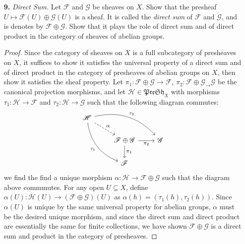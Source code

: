 \documentclass{article}
\newcommand{\fF}{\mathscr{F}}
\newcommand{\fG}{\mathscr{G}}
\begin{document}
\begin{enumerate} [label=\textbf{\arabic*.}, leftmargin=0em]
\item[\textbf{9.}] \textit{Direct Sum.} Let $\fF$ and $\fG$ be sheaves on $X$. Show that the presheaf $U \mapsto \fF(U) \oplus \fG(U)$ is a sheaf. It is called the \textit{direct sum} of $\fF$ and $\fG$, and is denotes by $\fF \oplus \fG$. Show that it plays the role of direct sum and of direct product in the category of sheaves of abelian groups.

\begin{proof}
   Since the category of sheaves on $X$ is a full subcategory of presheaves on $X$, it suffices to show it satisfies the universal property of a direct sum and of direct product in the category of presheaves of abelian groups on $X$, then show it satisfies the sheaf property. Let $\pi_1 : \fF \oplus \fG \to \fF$, $\pi_2 : \fF \oplus \fG_ \to \fG$ be the canonical projection morphisms, and let $\mathscr{H} \in \mathfrak{PreSh}_X$ with morphisms $\tau_1 : \mathscr{H} \to \fF$ and $\tau_2 : \mathscr{H} \to \fG$ such that the following diagram commutes:
   \[ \begin{tikzcd}
    \mathscr{H} \arrow[rrd, "\tau_2", bend left] \arrow[rdd, "\tau_1"', bend right] \arrow[rd, "\alpha", dashed] &                                                                       &             \\
                                                                                                                 & \mathscr{F} \oplus \mathscr{G} \arrow[d, "\pi_1"] \arrow[r, "\pi_2"'] & \mathscr{G} \\
                                                                                                                 & \mathscr{F}                                                           &            
    \end{tikzcd} \]
    we find the find a unique morphism $\alpha : \mathscr{H} \to \fF \oplus \fG$ such that the diagram above commmutes. For any open $U \subseteq X$, define $\alpha(U) : \mathscr{H}(U) \to (\fF \oplus \fG)(U)$ as $\alpha(h) = (\tau_1(h), \tau_2(h))$. Since $\alpha(U)$ is unique by the same universal property for abelian groups, $\alpha$ must be the desired unique morphism, and since the direct sum and direct product are essentially the same for finite collections, we have shown $\fF \oplus \fG$ is a direct sum and product in the category of presheaves. 


\end{proof}
\end{enumerate}
\end{document}
